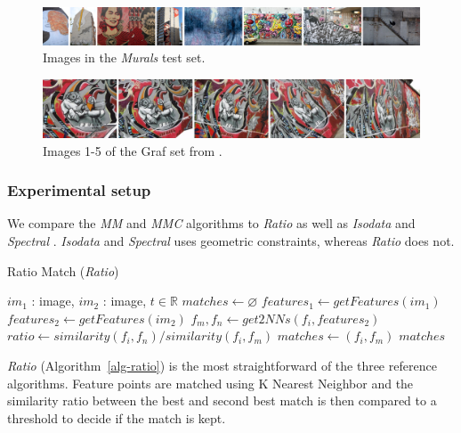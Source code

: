 \documentclass{article}
\begin{document}
\begin{figure}[t]
	\centering
	\includegraphics[width=\textwidth]{images/murals}
	\caption{Images in the \emph{Murals} test set.}
	\label{fig:murals}
\end{figure}

\begin{figure}[htb]
	\centering
	\includegraphics[width=\columnwidth]{images/graf12345.jpg}
	\caption{Images 1-5 of the Graf set from \cite{mikolajczyk2005performance}.}
	\label{fig:Graf}
\end{figure}


\subsubsection{Experimental setup}
We compare the \emph{MM} and \emph{MMC} algorithms to \emph{Ratio} 
\cite{lowe2004sift} as well as \emph{Isodata} \cite{das2008event} and 
\emph{Spectral} \cite{leordeanu2005spectral}.  \emph{Isodata} and 
\emph{Spectral} uses geometric constraints, whereas \emph{Ratio} does 
not.

\begin{algorithm}
\caption{Ratio Match (\emph{Ratio})}
\label{alg-ratio}
\begin{algorithmic}
\Require $im_1$ : image, $im_2$ : image, $t \in \mathbb{R}$
\State $matches\gets \varnothing$
\State $features_1 \gets getFeatures(im_1)$
\State $features_2 \gets getFeatures(im_2)$
    \State $f_m,f_n \gets get2NNs(f_i, features_2)$
	\State $ratio \gets similarity(f_i, f_n) / similarity(f_i, f_m)$
        \State $matches \gets \left(f_i, f_m\right)$
	\EndIf
\EndFor
\Return $matches$
\end{algorithmic}
\end{algorithm}

\emph{Ratio} (Algorithm~\ref{alg-ratio}) is the most straightforward of 
the three reference algorithms. Feature points are matched using K 
Nearest Neighbor and the similarity ratio between the best and second 
best match is then compared to a threshold to decide if the match is 
kept.
\end{document}
